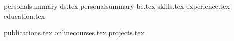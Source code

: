 \documentclass[12pt, a4paper]{awesome-cv}
\newcommand*{\sectiondir}{resume/}
\newcounter{ds_or_be}
\newcounter{res_cv}
\begin{document}
\makecvheader

{
{personalsummary-ds.tex}
}
{
{personalsummary-be.tex}
}
{skills.tex}
{experience.tex}
{education.tex}

{\pagebreak}
{}
{publications.tex}
{onlinecourses.tex}
{projects.tex}
\end{document}
